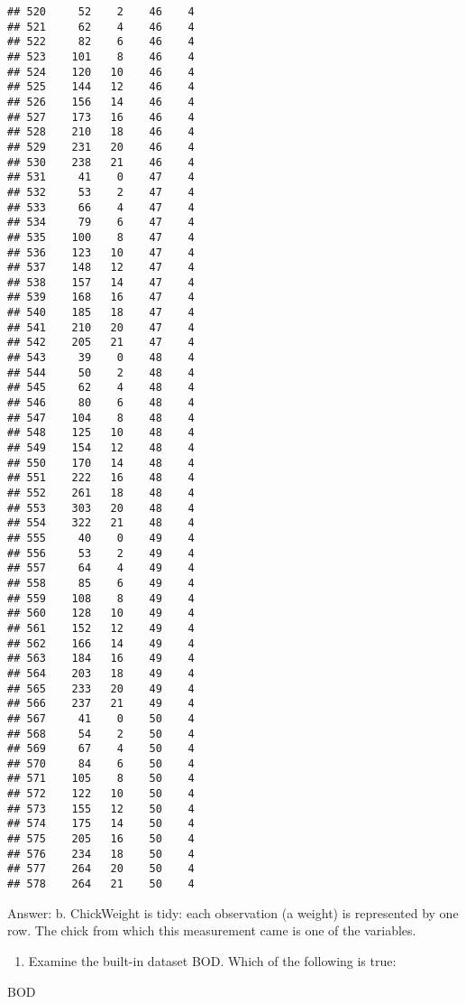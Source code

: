 \documentclass[
]{article}
\newenvironment{Shaded}{\begin{snugshade}}{\end{snugshade}}
\newcommand{\NormalTok}[1]{#1}
\providecommand{\tightlist}{%
  \setlength{\itemsep}{0pt}\setlength{\parskip}{0pt}}
\begin{document}
\begin{verbatim}
## 520     52    2    46    4
## 521     62    4    46    4
## 522     82    6    46    4
## 523    101    8    46    4
## 524    120   10    46    4
## 525    144   12    46    4
## 526    156   14    46    4
## 527    173   16    46    4
## 528    210   18    46    4
## 529    231   20    46    4
## 530    238   21    46    4
## 531     41    0    47    4
## 532     53    2    47    4
## 533     66    4    47    4
## 534     79    6    47    4
## 535    100    8    47    4
## 536    123   10    47    4
## 537    148   12    47    4
## 538    157   14    47    4
## 539    168   16    47    4
## 540    185   18    47    4
## 541    210   20    47    4
## 542    205   21    47    4
## 543     39    0    48    4
## 544     50    2    48    4
## 545     62    4    48    4
## 546     80    6    48    4
## 547    104    8    48    4
## 548    125   10    48    4
## 549    154   12    48    4
## 550    170   14    48    4
## 551    222   16    48    4
## 552    261   18    48    4
## 553    303   20    48    4
## 554    322   21    48    4
## 555     40    0    49    4
## 556     53    2    49    4
## 557     64    4    49    4
## 558     85    6    49    4
## 559    108    8    49    4
## 560    128   10    49    4
## 561    152   12    49    4
## 562    166   14    49    4
## 563    184   16    49    4
## 564    203   18    49    4
## 565    233   20    49    4
## 566    237   21    49    4
## 567     41    0    50    4
## 568     54    2    50    4
## 569     67    4    50    4
## 570     84    6    50    4
## 571    105    8    50    4
## 572    122   10    50    4
## 573    155   12    50    4
## 574    175   14    50    4
## 575    205   16    50    4
## 576    234   18    50    4
## 577    264   20    50    4
## 578    264   21    50    4
\end{verbatim}

Answer: b. ChickWeight is tidy: each observation (a weight) is
represented by one row. The chick from which this measurement came is
one of the variables.

\begin{enumerate}
\def\labelenumi{\arabic{enumi}.}
\setcounter{enumi}{2}
\tightlist
\item
  Examine the built-in dataset BOD. Which of the following is true:
\end{enumerate}

\begin{Shaded}
\begin{Highlighting}[]
\NormalTok{BOD}
\end{Highlighting}
\end{Shaded}
\end{document}
